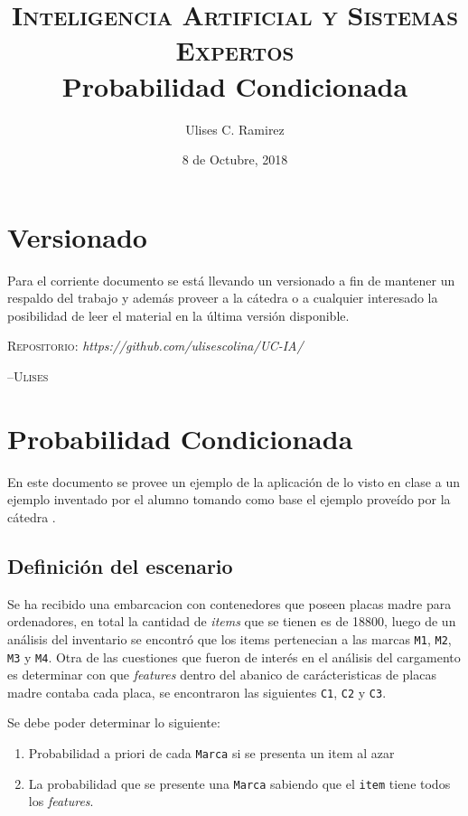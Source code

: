 \documentclass{article}
\title{\textsc{Inteligencia Artificial y Sistemas Expertos}\\Probabilidad
Condicionada}
\author{Ulises C. Ramirez}
\date{8 de Octubre, 2018}
\begin{document}
\maketitle
{}
\newpage
\section*{Versionado}
Para el corriente documento se est\'a llevando un versionado a fin de mantener un respaldo del trabajo y adem\'as proveer a la c\'atedra o a cualquier interesado la posibilidad de leer el material en la \'ultima versi\'on disponible.\\

\begin{center}
  \textsc{Repositorio}: \textit{https://github.com/ulisescolina/UC-IA/}
\end{center}

\hfill--\textsc{Ulises}
\newpage

\section*{Probabilidad Condicionada}
En este documento se provee un ejemplo de la aplicaci\'on de lo visto en
clase a un ejemplo inventado por el alumno tomando como base el ejemplo
prove\'ido por la c\'atedra \cite{sebpia2018}.

\subsection*{Definici\'on del escenario}
Se ha recibido una embarcacion con contenedores que poseen placas madre para
ordenadores, en total la cantidad de \textit{items} que se tienen es de
18800, luego de un an\'alisis del inventario se encontr\'o que los
items pertenecian a las marcas \texttt{M1}, \texttt{M2}, \texttt{M3} y
\texttt{M4}. Otra de las cuestiones que fueron de inter\'es en el an\'alisis
del cargamento es determinar con que \textit{features} dentro del abanico
de car\'acteristicas de placas madre contaba cada placa, se encontraron las
siguientes \texttt{C1}, \texttt{C2} y \texttt{C3}.

Se debe poder determinar lo siguiente:
\begin{enumerate}
\item Probabilidad a priori de cada \texttt{Marca} si se presenta un item al
azar
\item La probabilidad que se presente una \texttt{Marca} sabiendo que el
\texttt{item} tiene todos los \textit{features}.
\end{enumerate}
\end{document}

